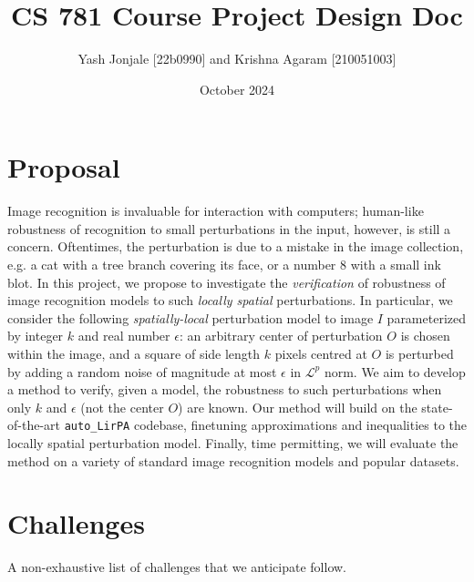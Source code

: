 \documentclass{article}
\title{CS 781 Course Project Design Doc}
\author{Yash Jonjale [22b0990] and Krishna Agaram [210051003]}
\date{October 2024}
\begin{document}
\maketitle
\tableofcontents
\newpage

\section{Proposal}\label{sec:proposal}

Image recognition is invaluable for interaction with computers; human-like robustness of recognition to small perturbations in the input, however, is still a concern. Oftentimes, the perturbation is due to a mistake in the image collection, e.g. a cat with a tree branch covering its face, or a number 8 with a small ink blot. In this project, we propose to investigate the \emph{verification} of robustness of image recognition models to such \emph{locally spatial} perturbations. In particular, we consider the following \emph{spatially-local} perturbation model to image $I$ parameterized by integer $k$ and real number $\epsilon$: an arbitrary center of perturbation $O$ is chosen within the image, and a square of side length $k$ pixels centred at $O$ is perturbed by adding a random noise of magnitude at most $\epsilon$ in $\mathcal L^p$ norm. We aim to develop a method to verify, given a model, the robustness to such perturbations when only $k$ and $\epsilon$ (not the center $O$) are known. Our method will build on the state-of-the-art \texttt{auto\_LirPA} codebase, finetuning approximations and inequalities to the locally spatial perturbation model. Finally, time permitting, we will evaluate the method on a variety of standard image recognition models and popular datasets.

\section{Challenges}\label{sec:challenges}

A non-exhaustive list of challenges that we anticipate follow.
\end{document}

